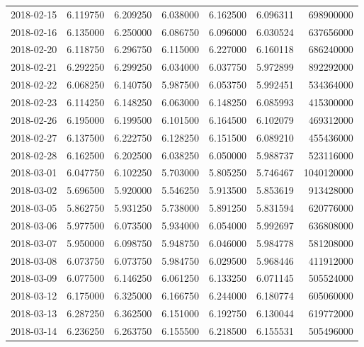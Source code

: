 \begin{tabular}{lrrrrrr}
2018-02-15 &    6.119750 &    6.209250 &    6.038000 &    6.162500 &    6.096311 &   698900000 \\
2018-02-16 &    6.135000 &    6.250000 &    6.086750 &    6.096000 &    6.030524 &   637656000 \\
2018-02-20 &    6.118750 &    6.296750 &    6.115000 &    6.227000 &    6.160118 &   686240000 \\
2018-02-21 &    6.292250 &    6.299250 &    6.034000 &    6.037750 &    5.972899 &   892292000 \\
2018-02-22 &    6.068250 &    6.140750 &    5.987500 &    6.053750 &    5.992451 &   534364000 \\
2018-02-23 &    6.114250 &    6.148250 &    6.063000 &    6.148250 &    6.085993 &   415300000 \\
2018-02-26 &    6.195000 &    6.199500 &    6.101500 &    6.164500 &    6.102079 &   469312000 \\
2018-02-27 &    6.137500 &    6.222750 &    6.128250 &    6.151500 &    6.089210 &   455436000 \\
2018-02-28 &    6.162500 &    6.202500 &    6.038250 &    6.050000 &    5.988737 &   523116000 \\
2018-03-01 &    6.047750 &    6.102250 &    5.703000 &    5.805250 &    5.746467 &  1040120000 \\
2018-03-02 &    5.696500 &    5.920000 &    5.546250 &    5.913500 &    5.853619 &   913428000 \\
2018-03-05 &    5.862750 &    5.931250 &    5.738000 &    5.891250 &    5.831594 &   620776000 \\
2018-03-06 &    5.977500 &    6.073500 &    5.934000 &    6.054000 &    5.992697 &   636808000 \\
2018-03-07 &    5.950000 &    6.098750 &    5.948750 &    6.046000 &    5.984778 &   581208000 \\
2018-03-08 &    6.073750 &    6.073750 &    5.984750 &    6.029500 &    5.968446 &   411912000 \\
2018-03-09 &    6.077500 &    6.146250 &    6.061250 &    6.133250 &    6.071145 &   505524000 \\
2018-03-12 &    6.175000 &    6.325000 &    6.166750 &    6.244000 &    6.180774 &   605060000 \\
2018-03-13 &    6.287250 &    6.362500 &    6.151000 &    6.192750 &    6.130044 &   619772000 \\
2018-03-14 &    6.236250 &    6.263750 &    6.155500 &    6.218500 &    6.155531 &   505496000 \\

\end{tabular}
